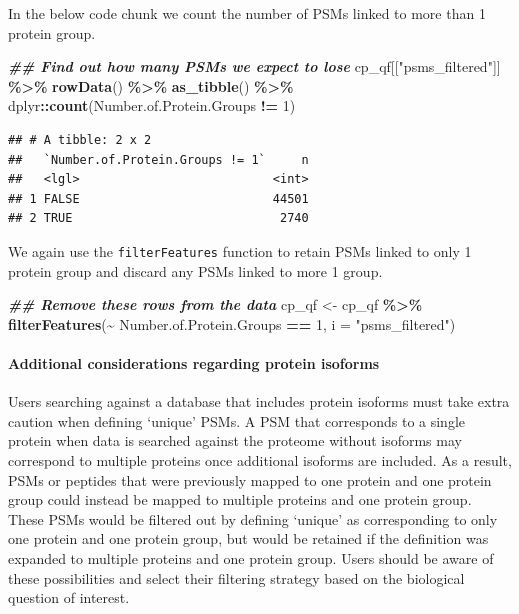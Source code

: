 \documentclass[9pt,a4paper,]{extarticle}
\newenvironment{Shaded}{\begin{snugshade}}{\end{snugshade}}
\newcommand{\AttributeTok}[1]{\textcolor[rgb]{0.13,0.29,0.53}{#1}}
\newcommand{\DecValTok}[1]{\textcolor[rgb]{0.00,0.00,0.81}{#1}}
\newcommand{\DocumentationTok}[1]{\textcolor[rgb]{0.56,0.35,0.01}{\textbf{\textit{#1}}}}
\newcommand{\FunctionTok}[1]{\textcolor[rgb]{0.13,0.29,0.53}{\textbf{#1}}}
\newcommand{\NormalTok}[1]{#1}
\newcommand{\OtherTok}[1]{\textcolor[rgb]{0.56,0.35,0.01}{#1}}
\newcommand{\SpecialCharTok}[1]{\textcolor[rgb]{0.81,0.36,0.00}{\textbf{#1}}}
\newcommand{\StringTok}[1]{\textcolor[rgb]{0.31,0.60,0.02}{#1}}
\begin{document}
In the below code chunk we count the number of PSMs linked to more than 1
protein group.

\begin{Shaded}
\begin{Highlighting}[]
\DocumentationTok{\#\# Find out how many PSMs we expect to lose}
\NormalTok{cp\_qf[[}\StringTok{"psms\_filtered"}\NormalTok{]] }\SpecialCharTok{\%\textgreater{}\%} 
  \FunctionTok{rowData}\NormalTok{() }\SpecialCharTok{\%\textgreater{}\%} 
  \FunctionTok{as\_tibble}\NormalTok{() }\SpecialCharTok{\%\textgreater{}\%} 
\NormalTok{  dplyr}\SpecialCharTok{::}\FunctionTok{count}\NormalTok{(Number.of.Protein.Groups }\SpecialCharTok{!=} \DecValTok{1}\NormalTok{)}
\end{Highlighting}
\end{Shaded}

\begin{verbatim}
## # A tibble: 2 x 2
##   `Number.of.Protein.Groups != 1`     n
##   <lgl>                           <int>
## 1 FALSE                           44501
## 2 TRUE                             2740
\end{verbatim}

We again use the \texttt{filterFeatures} function to retain PSMs linked to only
1 protein group and discard any PSMs linked to more 1 group.

\begin{Shaded}
\begin{Highlighting}[]
\DocumentationTok{\#\# Remove these rows from the data}
\NormalTok{cp\_qf }\OtherTok{\textless{}{-}}\NormalTok{ cp\_qf }\SpecialCharTok{\%\textgreater{}\%}
  \FunctionTok{filterFeatures}\NormalTok{(}\SpecialCharTok{\textasciitilde{}}\NormalTok{ Number.of.Protein.Groups }\SpecialCharTok{==} \DecValTok{1}\NormalTok{, }
                 \AttributeTok{i =} \StringTok{"psms\_filtered"}\NormalTok{)}
\end{Highlighting}
\end{Shaded}

\hypertarget{additional-considerations-regarding-protein-isoforms}{%
\paragraph{Additional considerations regarding protein isoforms}\label{additional-considerations-regarding-protein-isoforms}}

Users searching against a database that includes protein isoforms must take
extra caution when defining `unique' PSMs. A PSM that corresponds to a single
protein when data is searched against the proteome without isoforms may
correspond to multiple proteins once additional isoforms are included. As a
result, PSMs or peptides that were previously mapped to one protein and one
protein group could instead be mapped to multiple proteins and one protein group.
These PSMs would be filtered out by defining `unique' as corresponding to only
one protein and one protein group, but would be retained if the definition was
expanded to multiple proteins and one protein group. Users should be aware of
these possibilities and select their filtering strategy based on the biological
question of interest.
\end{document}
